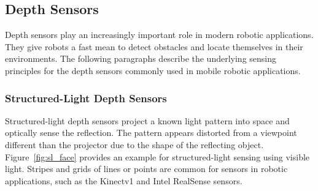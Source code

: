 \subsection{Depth Sensors}

Depth sensors play an increasingly important role in modern robotic applications.
They give robots a fast mean to detect obstacles and locate themselves in their environments.
The following paragraphs describe the underlying sensing principles for the depth sensors commonly used in mobile robotic applications.

\subsubsection{Structured-Light Depth Sensors}

Structured-light depth sensors project a known light pattern into space and optically sense the reflection\cite{blais_2003}.
The pattern appears distorted from a viewpoint different than the projector due to the shape of the reflecting object.
Figure~\ref{fig:sl_face} provides an example for structured-light sensing using visible light.
Stripes and grids of lines or points are common for sensors in robotic applications\cite{blais_2003}, such as the Kinectv1\cite{wasenmuller_accv2016} and Intel RealSense\cite{intel_realsense} sensors.
